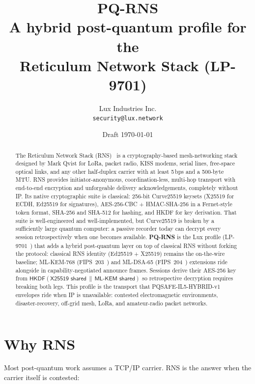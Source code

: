 \documentclass[11pt,a4paper]{article}
\title{\textbf{PQ-RNS}\\
       \large A hybrid post-quantum profile for the\\
       Reticulum Network Stack (LP-9701)}
\author{Lux Industries Inc.\\
        \texttt{security@lux.network}}
\date{Draft \today}
\begin{document}
\luxcoverpage
\maketitle

\begin{abstract}
The Reticulum Network Stack (RNS)~\cite{rns-manual,rns-repo} is a
cryptography-based mesh-networking stack designed by Mark Qvist for
LoRa, packet radio, KISS modems, serial lines, free-space optical
links, and any other half-duplex carrier with at least 5\,bps and a
500-byte MTU. RNS provides initiator-anonymous, coordination-less,
multi-hop transport with end-to-end encryption and unforgeable delivery
acknowledgements, completely without IP. Its native cryptographic suite
is classical: 256-bit Curve25519 keysets (X25519 for ECDH, Ed25519 for
signatures), AES-256-CBC + HMAC-SHA-256 in a Fernet-style token format,
SHA-256 and SHA-512 for hashing, and HKDF for key derivation. That
suite is well-engineered and well-implemented, but Curve25519 is broken
by a sufficiently large quantum computer: a passive recorder today can
decrypt every session retrospectively when one becomes available.
\textbf{PQ-RNS} is the Lux profile (LP-9701~\cite{lp9701}) that adds a
hybrid post-quantum layer on top of classical RNS without forking the
protocol: classical RNS identity (Ed25519 + X25519) remains the
on-the-wire baseline; ML-KEM-768 (FIPS~203~\cite{fips203}) and
ML-DSA-65 (FIPS~204~\cite{fips204}) extensions ride alongside in
capability-negotiated announce frames. Sessions derive their AES-256
key from $\textsf{HKDF}(\textsf{X25519 shared}\,\|\,\textsf{ML-KEM shared})$
so retrospective decryption requires breaking both legs.
This profile is the transport that PQSAFE-IL5-HYBRID-v1 envelopes ride
when IP is unavailable: contested electromagnetic environments,
disaster-recovery, off-grid mesh, LoRa, and amateur-radio packet
networks.
\end{abstract}

\tableofcontents

\section{Why RNS}
\label{sec:why-rns}

Most post-quantum work assumes a TCP/IP carrier. RNS is the answer when
the carrier itself is contested:
\end{document}

